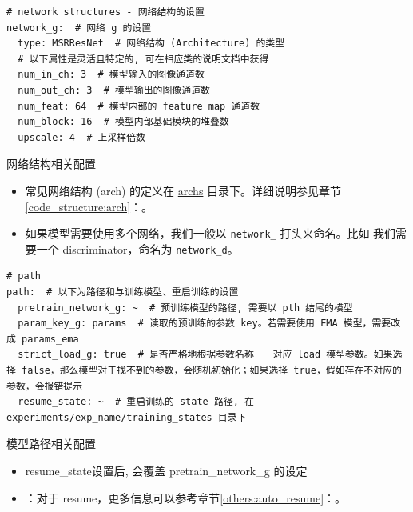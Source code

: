 \documentclass[../main.tex]{subfiles}
\begin{document}
\begin{verbatim}
# network structures - 网络结构的设置
network_g:  # 网络 g 的设置
  type: MSRResNet  # 网络结构 (Architecture) 的类型
  # 以下属性是灵活且特定的, 可在相应类的说明文档中获得
  num_in_ch: 3  # 模型输入的图像通道数
  num_out_ch: 3  # 模型输出的图像通道数
  num_feat: 64  # 模型内部的 feature map 通道数
  num_block: 16  # 模型内部基础模块的堆叠数
  upscale: 4  # 上采样倍数
\end{verbatim}

\begin{exampleBox}[righthand ratio=0.00, sidebyside, sidebyside align=center, lower separated=false]{网络结构相关配置}
\begin{itemize}
    \item 常见网络结构 (arch) 的定义在 \href{https://github.com/XPixelGroup/BasicSR/tree/master/basicsr/archs}{archs} 目录下。详细说明参见章节\ref{code_structure:arch}：。
    \item 如果模型需要使用多个网络，我们一般以 \texttt{network\_} 打头来命名。比如 我们需要一个 discriminator，命名为  \texttt{network\_d}。
\end{itemize}
\end{exampleBox}

\begin{verbatim}
# path
path:  # 以下为路径和与训练模型、重启训练的设置
  pretrain_network_g: ~  # 预训练模型的路径, 需要以 pth 结尾的模型
  param_key_g: params  # 读取的预训练的参数 key。若需要使用 EMA 模型，需要改成 params_ema
  strict_load_g: true  # 是否严格地根据参数名称一一对应 load 模型参数。如果选择 false，那么模型对于找不到的参数，会随机初始化；如果选择 true，假如存在不对应的参数，会报错提示
  resume_state: ~  # 重启训练的 state 路径, 在 experiments/exp_name/training_states 目录下
\end{verbatim}

\begin{exampleBox}[righthand ratio=0.00, sidebyside, sidebyside align=center, lower separated=false]{模型路径相关配置}
\begin{itemize}
    \item resume\_state设置后, 会覆盖 pretrain\_network\_g 的设定
    \item ：对于 resume，更多信息可以参考章节\ref{others:auto_resume}：。
\end{itemize}
\end{exampleBox}
\end{document}

